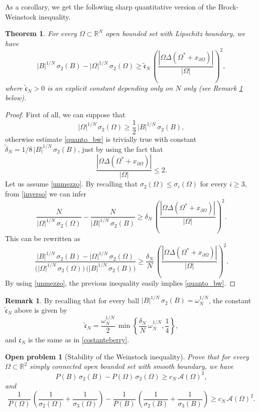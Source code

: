 \documentclass{amsart}
\newtheorem{theorem}[lemma]{Theorem}
\newtheorem{openpb}{Open problem}
\theoremstyle{definition}
\newtheorem{remark}[lemma]{Remark}
\numberwithin{equation}{section}
\begin{document}
As a corollary, we get the following sharp quantitative version of the Brock-Weinstock inequality.
\begin{theorem}
For every $\Omega\subset\mathbb{R}^N$ open bounded set with Lipschitz boundary, we have
\begin{equation}
\label{quanto_bw}
|B|^{1/N}\,\sigma_2(B)-|\Omega|^{1/N}\, \sigma_2(\Omega) \ge \widetilde{\mathfrak{c}}_N\, \left(\frac{|\Omega\Delta(\Omega^*+x_{\partial\Omega})|}{|\Omega|}\right)^2,
\end{equation}
where $\widetilde{\mathfrak{c}}_N>0$ is an explicit constant depending only on $N$ only (see Remark \ref{oss:costantestek} below).
\end{theorem}
\begin{proof}
First of all, we can suppose that
\begin{equation}
\label{unmezzo}
|\Omega|^{1/N}\, \sigma_2(\Omega)\ge \frac{1}{2}\, |B|^{1/N}\,\sigma_2(B),
\end{equation}
otherwise estimate \eqref{quanto_bw} is trivially true with constant $\widetilde\delta_N=1/8\,|B|^{1/N}\,\sigma_2(B)$, just by using the fact that
\[
\frac{|\Omega\Delta (\Omega^*+x_{\partial\Omega})|}{|\Omega|}\le 2.
\]
Let us assume \eqref{unmezzo}. By recalling that $\sigma_2(\Omega)\le\sigma_i(\Omega)$ for every $i\ge 3$, from \eqref{inverso} we can infer
\[
\frac{N}{|\Omega|^{1/N}\, \sigma_2(\Omega)}-\frac{N}{|B|^{1/N}\,\sigma_2(B)}\ge \delta_{N}\, \left(\frac{|\Omega\Delta (\Omega^*+x_{\partial\Omega})|}{|\Omega|}\right)^2.
\]
This can be rewritten as
\[
\frac{|B|^{1/N}\,\sigma_2(B)-|\Omega|^{1/N}\, \sigma_2(\Omega)}{\Big(|\Omega|^{1/N}\, \sigma_2(\Omega)\Big)\,\Big(|B|^{1/N}\,\sigma_2(B)\Big)}\ge \frac{\delta_N}{N}\,\left(\frac{|\Omega\Delta (\Omega^*+x_{\partial\Omega})|}{|\Omega|}\right)^2.
\]
By using \eqref{unmezzo}, the previous inequality easily implies \eqref{quanto_bw}.
\end{proof}
\begin{remark}
\label{oss:costantestek}
By recalling that for every ball $|B|^{1/N}\,\sigma_2(B)=\omega_N^{1/N}$, the constant $\widetilde{\mathfrak{c}}_N$ above is given by
\[
\widetilde{\mathfrak{c}}_N=\frac{\omega_{N}^{1/N}}{2}\,\min\left\{\frac{\delta_N}{N}\,\omega_N^{1/N},\frac{1}{4}\right\},
\]
and $\mathfrak{c}_N$ is the same as in \eqref{costanteberry}.
\end{remark}


\begin{openpb}[Stability of the Weinstock inequality]
Prove that for every $\Omega\subset\mathbb{R}^2$ simply connected open bounded set with smooth boundary, we have
\[
P(B)\,\sigma_2(B)-P(\Omega)\, \sigma_2(\Omega)\ge c_N\,\mathcal{A}(\Omega)^2,
\]
and
\[
\frac{1}{P(\Omega)}\,\left(\frac{1}{\sigma_2(\Omega)}+\frac{1}{\sigma_3(\Omega)}\right)-\frac{1}{P(B)}\,\left(\frac{1}{\sigma_2(B)}+\frac{1}{\sigma_3(B)}\right)\ge c_N\,\mathcal{A}(\Omega)^2.
\]
\end{openpb}
\end{document}
